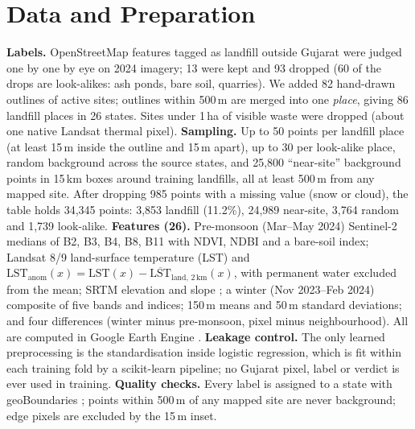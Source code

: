 \documentclass{article}
\begin{document}
\section{Data and Preparation}
\textbf{Labels.} OpenStreetMap features tagged as landfill outside Gujarat were judged one by one by eye on 2024 imagery; 13 were kept and 93 dropped (60 of the drops are look-alikes: ash ponds, bare soil, quarries). We added 82 hand-drawn outlines of active sites; outlines within 500\,m are merged into one \emph{place}, giving 86 landfill places in 26 states. Sites under 1\,ha of visible waste were dropped (about one native Landsat thermal pixel). \textbf{Sampling.} Up to 50 points per landfill place (at least 15\,m inside the outline and 15\,m apart), up to 30 per look-alike place, random background across the source states, and 25,800 ``near-site'' background points in 15\,km boxes around training landfills, all at least 500\,m from any mapped site. After dropping 985 points with a missing value (snow or cloud), the table holds 34,345 points: 3,853 landfill (11.2\%), 24,989 near-site, 3,764 random and 1,739 look-alike. \textbf{Features (26).} Pre-monsoon (Mar--May 2024) Sentinel-2 medians of B2, B3, B4, B8, B11 with NDVI, NDBI and a bare-soil index; Landsat 8/9 land-surface temperature (LST) and $\mathrm{LST_{anom}}(x)=\mathrm{LST}(x)-\overline{\mathrm{LST}}_{\text{land},\,2\,\text{km}}(x)$, with permanent water \citep{pekel2016} excluded from the mean; SRTM elevation and slope \citep{farr2007}; a winter (Nov 2023--Feb 2024) composite of five bands and indices; 150\,m means and 50\,m standard deviations; and four differences (winter minus pre-monsoon, pixel minus neighbourhood). All are computed in Google Earth Engine \citep{gorelick2017}. \textbf{Leakage control.} The only learned preprocessing is the standardisation inside logistic regression, which is fit within each training fold by a scikit-learn pipeline; no Gujarat pixel, label or verdict is ever used in training. \textbf{Quality checks.} Every label is assigned to a state with geoBoundaries \citep{runfola2020}; points within 500\,m of any mapped site are never background; edge pixels are excluded by the 15\,m inset.
\end{document}
